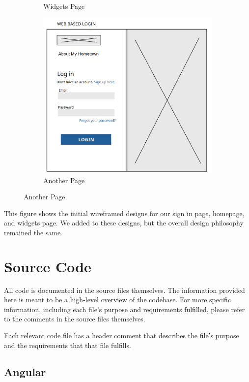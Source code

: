 \documentclass[12pt]{article}
\begin{document}
\begin{figure}[htbp]
\begin{subfigure}[b]{0.48\textwidth}
        \caption{Widgets Page}
    \end{subfigure}
    \centering
    \begin{subfigure}[b]{0.48\textwidth}
        \centering
        \includegraphics[width=\textwidth]{images/sign_in_page.png}
        \caption{Another Page}
    \end{subfigure}
\end{figure}

This figure shows the initial wireframed designs for our sign in page, homepage, and widgets page. We added to these designs, but the overall design philosophy remained the same.

\newpage

\section{Source Code}

All code is documented in the source files themselves. The information provided here is meant to be a high-level overview of the codebase. For more specific information, including each file's purpose and requirements fulfilled, please refer to the comments in the source files themselves.

Each relevant code file has a header comment that describes the file's purpose and the requirements that that file fulfills.

\subsection{Angular}
\end{document}
